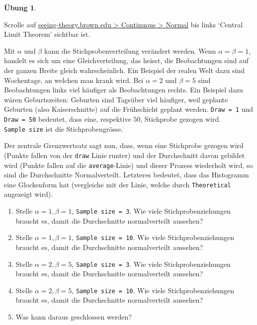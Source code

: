 \documentclass[
]{book}
\providecommand{\tightlist}{%
  \setlength{\itemsep}{0pt}\setlength{\parskip}{0pt}}
\theoremstyle{definition}
\theoremstyle{definition}
\theoremstyle{definition}
\newtheorem{exercise}{Übung}[chapter]
\theoremstyle{definition}
\theoremstyle{remark}
\begin{document}
\begin{exercise}
\protect\hypertarget{exr:ki-approx-normal}{}\label{exr:ki-approx-normal}\leavevmode

Scrolle auf \href{https://seeing-theory.brown.edu/probability-distributions/index.html\#section2}{seeing-theory.brown.edu \textgreater{} Continuous \textgreater{} Normal} bis links `Central Limit Theorem' sichtbar ist.

Mit \(\alpha\) und \(\beta\) kann die Stichprobenverteilung verändert werden. Wenn \(\alpha = \beta = 1\), handelt es sich um eine Gleichverteilung, das heisst, die Beobachtungen sind auf der ganzen Breite gleich wahrscheinlich. Ein Beispiel der realen Welt dazu sind Wochentage, an welchen man krank wird. Bei \(\alpha = 2\) und \(\beta = 5\) sind Beobachtungen links viel häufiger als Beobachtungen rechts. Ein Beispiel dazu wären Geburtszeiten: Geburten sind Tagsüber viel häufiger, weil geplante Geburten (also Kaiserschnitte) auf die Frühschicht geplant werden. \texttt{Draw\ =\ 1} und \texttt{Draw\ =\ 50} bedeutet, dass eine, respektive \(50\), Stichprobe gezogen wird. \texttt{Sample\ size} ist die Stichprobengrösse.

Der zentrale Grenzwertsatz sagt nun, dass, wenn eine Stichprobe gezogen wird (Punkte fallen von der \texttt{draw} Linie runter) und der Durchschnitt davon gebildet wird (Punkte fallen auf die \texttt{average}-Linie) und dieser Prozess wiederholt wird, so sind die Durchschnitte Normalverteilt. Letzteres bedeutet, dass das Histogramm eine Glockenform hat (vergleiche mit der Linie, welche durch \texttt{Theoretical} angezeigt wird).

\begin{enumerate}
\def\labelenumi{\alph{enumi})}
\tightlist
\item
  Stelle \(\alpha = 1, \beta = 1\), \texttt{Sample\ size\ =\ 3}. Wie viele Stichprobenziehungen braucht es, damit die Durchschnitte normalverteilt aussehen?
\item
  Stelle \(\alpha = 1, \beta = 1\), \texttt{Sample\ size\ =\ 10}. Wie viele Stichprobenziehungen braucht es, damit die Durchschnitte normalverteilt aussehen?
\item
  Stelle \(\alpha = 2, \beta = 5\), \texttt{Sample\ size\ =\ 3}. Wie viele Stichprobenziehungen braucht es, damit die Durchschnitte normalverteilt aussehen?
\item
  Stelle \(\alpha = 2, \beta = 5\), \texttt{Sample\ size\ =\ 10}. Wie viele Stichprobenziehungen braucht es, damit die Durchschnitte normalverteilt aussehen?
\item
  Was kann daraus geschlossen werden?
\end{enumerate}

\end{exercise}
\end{document}
